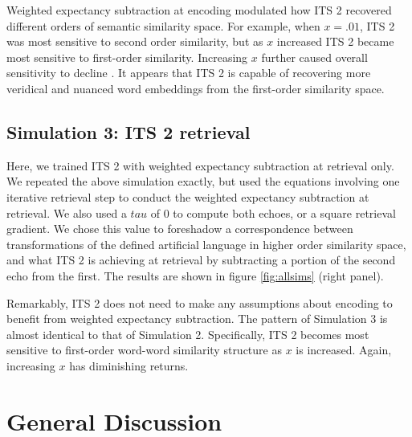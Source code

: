 \documentclass[10pt,letterpaper]{article}
\begin{document}
Weighted expectancy subtraction at encoding modulated how ITS 2 recovered different orders of semantic similarity space. For example, when \(x=.01\), ITS 2 was most sensitive to second order similarity, but as \(x\) increased ITS 2 became most sensitive to first-order similarity. Increasing \(x\) further caused overall sensitivity to decline \cite<akin to the detrimental effects of sub-sampling too much negative information, >{johnsRoleNegativeInformation2019}. It appears that ITS 2 is capable of recovering more veridical and nuanced word embeddings from the first-order similarity space.

\subsection{Simulation 3: ITS 2 retrieval}

Here, we trained ITS 2 with weighted expectancy subtraction at retrieval only. We repeated the above simulation exactly, but used the equations involving one iterative retrieval step to conduct the weighted expectancy subtraction at retrieval. We also used a \(tau\) of 0 to compute both echoes, or a square retrieval gradient. We chose this value to foreshadow a correspondence between transformations of the defined artificial language in higher order similarity space, and what ITS 2 is achieving at retrieval by subtracting a portion of the second echo from the first. The results are shown in figure \ref{fig:allsims} (right panel).


Remarkably, ITS 2 does not need to make any assumptions about encoding to benefit from weighted expectancy subtraction. The pattern of Simulation 3 is almost identical to that of Simulation 2. Specifically, ITS 2 becomes most sensitive to first-order word-word similarity structure as \(x\) is increased. Again, increasing \(x\) has diminishing returns.

\section{General Discussion}
\end{document}
